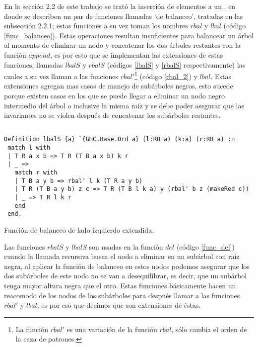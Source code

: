 En la secci\'on 2.2 de este trabajo se trat\'o la inserci\'on de elementos a un {\arn}, en donde se
describen un par de funciones llamadas `de balanceo', tratadas en las subsecci\'on 2.2.1; estas 
funciones a su vez toman los nombres \hyperref[func_balanceo]{$rbal$} y 
\hyperref[func_balanceo]{$lbal$} (c\'odigo \ref{func_balanceo}). Estas operaciones resultan 
insuficientes para balancear un \'arbol al momento de eliminar un nodo y concatenar los dos 
\'arboles restantes con la función \hyperref[func_app]{$append$}, es por esto que se implementan las
extensiones de estas funciones, llamadas \hyperref[lbalS]{$lbalS$} y \hyperref[lbalS]{$rbalS$} 
(c\'odigos \ref{lbalS} y \ref{rbalS} respectivamente) las cuales a su vez llaman a las funciones 
\hyperref[rbal_2]{$rbal'$}\footnote{La funci\'on \hyperref[rbal_2]{$rbal'$} es una variación de la 
función \hyperref[func_balanceo]{$rbal$}, s\'olo cambia el orden de la caza de patrones.} (c\'odigo
\ref{rbal_2}) y \hyperref[func_balanceo]{$lbal$}. Estas extensiones agregan mas casos de manejo de 
subárboles negros, esto sucede porque existen casos en los que se puede llegar a eliminar un nodo 
negro intermedio del \'arbol o inclusive la misma ra\'iz y se debe poder asegurar que las invariantes 
no se violen después de concatenar los subárboles restantes.

\begin{listing}[!ht]
\centering
\captionsetup{justification=centering}
\begin{verbatim}

Definition lbalS {a} `{GHC.Base.Ord a} (l:RB a) (k:a) (r:RB a) :=
 match l with
 | T R a x b => T R (T B a x b) k r
 | _ =>
   match r with
   | T B a y b => rbal' l k (T R a y b)
   | T R (T B a y b) z c => T R (T B l k a) y (rbal' b z (makeRed c))
   | _ => T R l k r
   end
 end.

\end{verbatim}
\caption{Funci\'on de balanceo de lado izquierdo extendida.}
\label{lbalS}
\end{listing}

Las funciones \hyperref[lbalS]{$rbalS$} y \hyperref[lbalS]{$lbalS$} son usadas en la funci\'on 
\hyperref[func_del]{$del$} (c\'odigo \ref{func_del}) cuando la llamada recursiva busca el nodo a 
eliminar en un sub\'arbol con ra\'iz negra, al aplicar la funci\'on de balanceo en estos nodos 
podemos asegurar que los dos subárboles de este nodo no se van a desequilibrar, es decir, que un 
subárbol tenga mayor altura negra que el otro. Estas funciones b\'asicamente hacen un reacomodo de 
los nodos de los sub\'arboles para despu\'es llamar a las funciones \hyperref[rbal_2]{$rbal'$} y 
\hyperref[func_balanceo]{$lbal$}, es por eso que decimos que son extensiones de \'estas.


